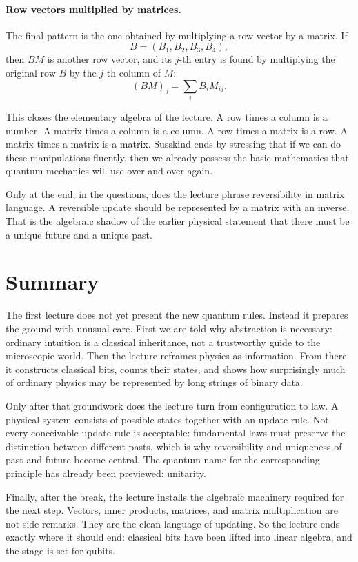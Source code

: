 \paragraph{Row vectors multiplied by matrices.}
The final pattern is the one obtained by multiplying a row vector by a matrix. If
\begin{equation}
B=(B_1,B_2,B_3,B_4),
\end{equation}
then \(BM\) is another row vector, and its \(j\)-th entry is found by multiplying the original row \(B\) by the \(j\)-th column of \(M\):
\begin{equation}
(BM)_j=\sum_i B_iM_{ij}.
\end{equation}

This closes the elementary algebra of the lecture. A row times a column is a number. A matrix times a column is a column. A row times a matrix is a row. A matrix times a matrix is a matrix. Susskind ends by stressing that if we can do these manipulations fluently, then we already possess the basic mathematics that quantum mechanics will use over and over again.

Only at the end, in the questions, does the lecture phrase reversibility in matrix language. A reversible update should be represented by a matrix with an inverse. That is the algebraic shadow of the earlier physical statement that there must be a unique future and a unique past.

\section{Summary}

The first lecture does not yet present the new quantum rules. Instead it prepares the ground with unusual care. First we are told why abstraction is necessary: ordinary intuition is a classical inheritance, not a trustworthy guide to the microscopic world. Then the lecture reframes physics as information. From there it constructs classical bits, counts their states, and shows how surprisingly much of ordinary physics may be represented by long strings of binary data.

Only after that groundwork does the lecture turn from configuration to law. A physical system consists of possible states together with an update rule. Not every conceivable update rule is acceptable: fundamental laws must preserve the distinction between different pasts, which is why reversibility and uniqueness of past and future become central. The quantum name for the corresponding principle has already been previewed: unitarity.

Finally, after the break, the lecture installs the algebraic machinery required for the next step. Vectors, inner products, matrices, and matrix multiplication are not side remarks. They are the clean language of updating. So the lecture ends exactly where it should end: classical bits have been lifted into linear algebra, and the stage is set for qubits.